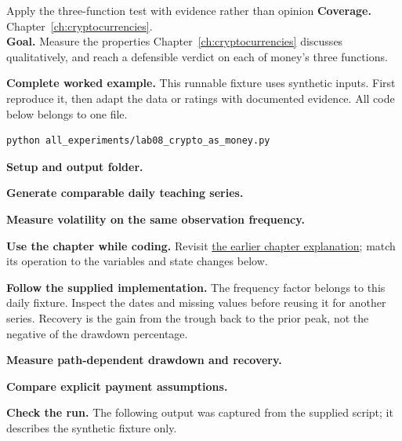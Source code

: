 
\begin{labproject}{Apply the three-function test with evidence rather than opinion}
\textbf{Coverage.} Chapter~\ref{ch:cryptocurrencies}.\\
\textbf{Goal.} Measure the properties Chapter~\ref{ch:cryptocurrencies} discusses qualitatively, and reach a defensible verdict on each of money's three functions.




\end{labproject}

\textbf{Complete worked example.} This runnable fixture uses synthetic inputs. First reproduce it, then adapt the data or ratings with documented evidence. All code below belongs to one file.
\begin{lstlisting}[style=utpterminal]
python all_experiments/lab08_crypto_as_money.py
\end{lstlisting}

\noindent\textbf{Setup and output folder.}


\noindent\textbf{Generate comparable daily teaching series.}


\noindent\textbf{Measure volatility on the same observation frequency.}



\textbf{Use the chapter while coding.} Revisit \hyperref[ch:cryptocurrencies]{the earlier chapter explanation}; match its operation to the variables and state changes below.

\textbf{Follow the supplied implementation.} The frequency factor belongs to this daily fixture. Inspect the dates and missing values before reusing it for another series. Recovery is the gain from the trough back to the prior peak, not the negative of the drawdown percentage.




\noindent\textbf{Measure path-dependent drawdown and recovery.}


\noindent\textbf{Compare explicit payment assumptions.}


\textbf{Check the run.} The following output was captured from the supplied script; it describes the synthetic fixture only.



